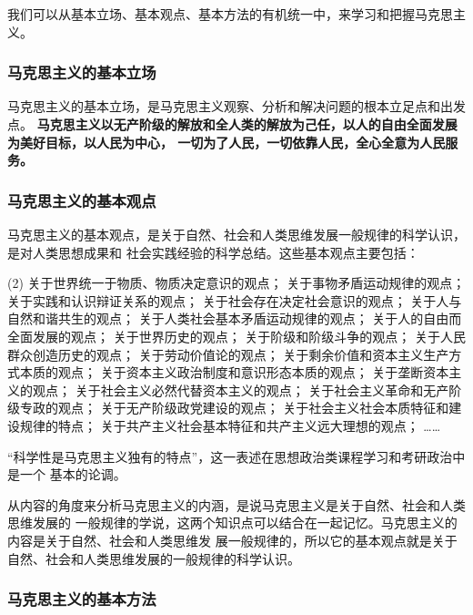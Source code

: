 \documentclass[10pt, UTF8]{book} %
\begin{document}
我们可以从基本立场、基本观点、基本方法的有机统一中，来学习和把握马克思主义。

\subsubsection{马克思主义的基本立场}

马克思主义的基本立场，是马克思主义观察、分析和解决问题的根本立足点和出发点。
\textbf{马克思主义以无产阶级的解放和全人类的解放为己任，以人的自由全面发展为美好目标，以人民为中心，
一切为了人民，一切依靠人民，全心全意为人民服务。}

\subsubsection{马克思主义的基本观点}

马克思主义的基本观点，是关于自然、社会和人类思维发展一般规律的科学认识，是对人类思想成果和
社会实践经验的科学总结。这些基本观点主要包括：
\begin{tasks}(2)
    \task 关于世界统一于物质、物质决定意识的观点；
    \task 关于事物矛盾运动规律的观点；
    \task 关于实践和认识辩证关系的观点；
    \task 关于社会存在决定社会意识的观点；
    \task 关于人与自然和谐共生的观点；
    \task 关于人类社会基本矛盾运动规律的观点；
    \task 关于人的自由而全面发展的观点；
    \task 关于世界历史的观点；
    \task 关于阶级和阶级斗争的观点；
    \task 关于人民群众创造历史的观点；
    \task 关于劳动价值论的观点；
    \task 关于剩余价值和资本主义生产方式本质的观点；
    \task 关于资本主义政治制度和意识形态本质的观点；
    \task 关于垄断资本主义的观点；
    \task 关于社会主义必然代替资本主义的观点；
    \task 关于社会主义革命和无产阶级专政的观点；
    \task 关于无产阶级政党建设的观点；
    \task 关于社会主义社会本质特征和建设规律的特点；
    \task 关于共产主义社会基本特征和共产主义远大理想的观点；
    \task ……
\end{tasks}
\begin{remark}
    “科学性是马克思主义独有的特点”，这一表述在思想政治类课程学习和考研政治中是一个
    基本的论调。
\end{remark}
\begin{remark}
    从内容的角度来分析马克思主义的内涵，是说{\kaishu 马克思主义是关于自然、社会和人类思维发展的
    一般规律的学说}，这两个知识点可以结合在一起记忆。马克思主义的内容是关于自然、社会和人类思维发
    展一般规律的，所以它的基本观点就是关于自然、社会和人类思维发展的一般规律的科学认识。
\end{remark}

\subsubsection{马克思主义的基本方法}
\end{document}
